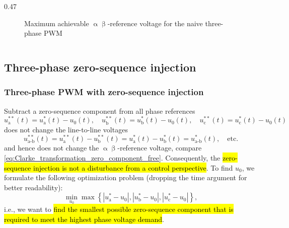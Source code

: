 \begin{frame}[b]
\begin{columns}[onlytextwidth]
\begin{column}{0.47\textwidth}
\begin{figure}
                \caption{Maximum achievable $\upalpha\upbeta$-reference voltage for the naive three-phase PWM}
                \label{fig:naive_three_phase_pwm_alpha_beta_voltage_limit}
            \end{figure}
        \end{column}
    \end{columns}
\end{frame}

\subsection{Three-phase zero-sequence injection}

\begin{frame}
    \frametitle{Three-phase PWM with zero-sequence injection}
    Subtract a zero-sequence component from all phase references
    \begin{equation}
        u_\mathrm{a}^{**}(t) = u_\mathrm{a}^*(t) - u_0(t), \quad u_\mathrm{b}^{**}(t) = u_\mathrm{b}^*(t) - u_0(t), \quad u_\mathrm{c}^{**}(t) = u_\mathrm{c}^*(t) - u_0(t)
    \end{equation}\pause%
    does not change the line-to-line voltages
    \begin{equation}
        u_\mathrm{a\text{-}b}^{**}(t) = u_\mathrm{a}^{**}(t) - u_\mathrm{b}^{**}(t) = u_\mathrm{a}^*(t) - u_\mathrm{b}^*(t) = u_\mathrm{a\text{-}b}^*(t), \quad \text{etc.}
    \end{equation}
    and hence does not change the $\upalpha\upbeta$-reference voltage, compare \eqref{eq:Clarke_transformation_zero_component_free}. \pause  Consequently, the \hl{zero-sequence injection is not a disturbance from a control perspective}. \pause To find $u_0$, we formulate the following optimization problem (dropping the time argument for better readability):
    \begin{equation}
        \min_{u_0} \max \left\{|u^*_\mathrm{a}-u_0|, |u^*_\mathrm{b}-u_0|, |u^*_\mathrm{c}-u_0|\right\},
        \label{eq:opt_problem_zero_sequence_PWM}
    \end{equation}
    i.e., we want to \hl{find the smallest possible zero-sequence component that is required to meet the highest phase voltage demand}.
\end{frame}

